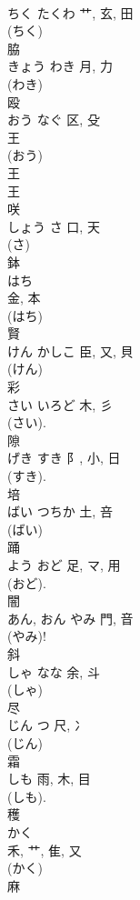 \documentclass[8pt]{extreport}
\begin{document}
\begin{CJK}{UTF8}{min}
\\	ちく	たくわ	艹, 玄, 田	
\\	(ちく) 
\\	脇	
\\	きょう	わき	月, 力	
\\	(わき) 
\\	殴	
\\	おう	なぐ	区, 殳	
\\	王
\\	(おう) 
\\	王 
\\	王 
\\	咲	
\\	しょう	さ	口, 天		
\\	(さ) 
\\	鉢	
\\	はち	
\\	金, 本	
\\	(はち) 
\\	賢	
\\	けん	かしこ	臣, 又, 貝	
\\	(けん) 
\\	彩	
\\	さい	いろど	木, 彡		
\\	(さい). 
\\	隙	
\\	げき	すき	阝, 小, 日	
\\	(すき).	
\\	培	
\\	ばい	つちか	土, 咅	
\\	(ばい) 
\\	踊	
\\	よう	おど	足, マ, 用	
\\	(おど). 
\\	闇	
\\	あん, おん	やみ	門, 音	
\\	(やみ)! 
\\	斜	
\\	しゃ	なな	余, 斗	
\\	(しゃ) 
\\	尽	
\\	じん	つ	尺, 冫	
\\	(じん) 
\\	霜	
\\	しも	雨, 木, 目	
\\	(しも). 
\\	穫	
\\	かく	
\\	禾, 艹, 隹, 又	
\\	(かく) 
\\	麻	

\end{CJK}
\end{document}
